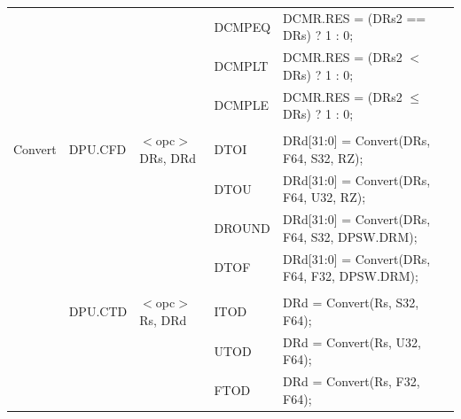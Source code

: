 \begin{table}
\begin{subtable}{\linewidth}
\begin{center}
\begin{tabular}{lllll}
                   &                   &                                       & DCMPEQ            & DCMR.RES = (DRs2 == DRs) ? 1 : 0;                                             \\
                   &                   &                                       & DCMPLT            & DCMR.RES = (DRs2 $<$ DRs) ? 1 : 0;                                            \\
                   &                   &                                       & DCMPLE            & DCMR.RES = (DRs2 $\le$ DRs) ? 1 : 0;                                          \\
                   &                   &                                       &                   &                                                                               \\
Convert            & DPU.CFD           & $<$opc$>$ DRs, DRd                    & DTOI              & DRd[31:0] = Convert(DRs, F64, S32, RZ);                                       \\
                   &                   &                                       & DTOU              & DRd[31:0] = Convert(DRs, F64, U32, RZ);                                       \\
                   &                   &                                       & DROUND            & DRd[31:0] = Convert(DRs, F64, S32, DPSW.DRM);                                 \\
                   &                   &                                       & DTOF              & DRd[31:0] = Convert(DRs, F64, F32, DPSW.DRM);                                 \\
                   &                   &                                       &                   &                                                                               \\
                   & DPU.CTD           & $<$opc$>$ Rs, DRd                     & ITOD              & DRd = Convert(Rs, S32, F64);                                                  \\
                   &                   &                                       & UTOD              & DRd = Convert(Rs, U32, F64);                                                  \\
                   &                   &                                       & FTOD              & DRd = Convert(Rs, F32, F64);                                                  \\

\end{tabular}
\end{center}
\end{subtable}
\end{table}
